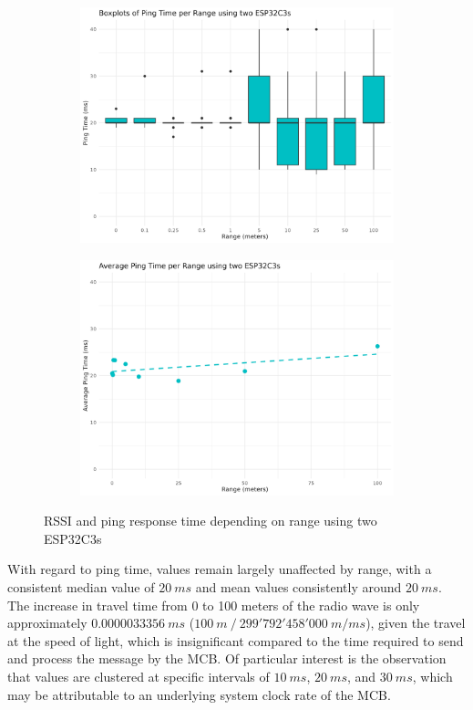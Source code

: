 \begin{figure}[ht]
    \begin{subfigure}{0.45\textwidth}
        \includegraphics[width=\linewidth]{rstudio/analysis/plots/ESP32C3_ping_box.png}
    \end{subfigure}
    \begin{subfigure}{0.45\textwidth}
        \includegraphics[width=\linewidth]{rstudio/analysis/plots/ESP32C3_avg_ping.png}
    \end{subfigure}
    \vspace{\ftspace}
    \caption{RSSI and ping response time depending on range using two ESP32C3s}
    \label{fig:rssipingrange_esp32c3}
\end{figure}

With regard to ping time, values remain largely unaffected by range, with a consistent median value of $20\ ms$ and mean values consistently around $20\ ms$. The increase in travel time from 0 to 100 meters of the radio wave is only approximately $0.0000033356\ ms$ ($100\ m\ /\ 299'792'458'000\ m/ms$), given the travel at the speed of light, which is insignificant compared to the time required to send and process the message by the MCB. Of particular interest is the observation that values are clustered at specific intervals of $10\ ms$, $20\ ms$, and $30\ ms$, which may be attributable to an underlying system clock rate of the MCB.

